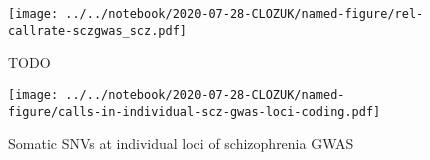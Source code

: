 \documentclass[letterpaper]{article}
\begin{document}
\begin{figure}[p]
\texttt{[image: ../../notebook/2020-07-28-CLOZUK/named-figure/rel-callrate-sczgwas\_scz.pdf]}
\caption{
TODO
}
\label{fig:scz-gwas-genes-vs-loci}
\end{figure}

\begin{figure}[p]
\texttt{[image: ../../notebook/2020-07-28-CLOZUK/named-figure/calls-in-individual-scz-gwas-loci-coding.pdf]}
\caption{
Somatic SNVs at individual loci of schizophrenia GWAS
}
\label{fig:indiv-scz-gwas-loci}
\end{figure}
\end{document}
